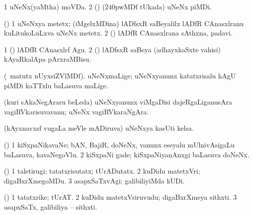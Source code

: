 {{{{{{{\bentry
{} 
\gl{\nA}
\expl{}
\bmng
\bnum
\num{1} uNeNx(yaMtha) moVDa. 
\num{2} (\ca) ($240$pwMDf tUkada) uNeNx piMDi. 
\enum
\emng
\eentry

\bentry
{} 
\gl{\nA}
\expl{}
\bmng
(\birx) 
\bnum
\num{1} uNeNxya metetx; (iMgelxMDina) lADfsxR saBeyalilx lADfR CAnasxlranu kuLitukoLuLxva uNeNx metetx. 
\num{2} (\birx) lADfR CAnasxlrana sAthxna, padavi. 
\enum
\emng

\noindent
\gl{\pagu}
\expl{}
\bmng
\bnum
\num{1}  (\birx) lADfR CAnasxlrf Agu. 
\num{2}  (\birx) lADfsxR saBeya (adhayxkaSxte vahisi) kAyaRkalApa pArxraMBisu. 
\enum
\emng
\eentry

\bentry
{} 
\gl{\nA}
\expl{}
\bmng
(\AseTxrXV\ matutx nUyxsiZVlMDf). uNeNxmaLige; uNeNxyanunx katatxrisalu hAgU piMDi kaTTxlu baLasuva maLige. 
\emng
\eentry

\bentry 
{} 
\gl{\nA}
\expl{}
\bmng
{} 
\emng
\eentry

\bentry
{}
\gl{\nA}
\expl{}
\bmng
{} 
\emng
\eentry

\bentry
{} 
\gl{\nA}
\expl{}
\bmng
(kuri sAkaNegAraru beLeda) uNeNxyanunx viMgaDisi dajeRgaLiganusAra vagiRVkarisuvavanu; uNeNx vagiRVkaraNgAra. 
\emng
\eentry

\bentry
{} 
\gl{\nA}
\expl{}
\bmng
(kAyxnavxsf \mo vugaLa meVle mADiruva) uNeNxya kasUti kelsa. 
\emng
\eentry

\bentry
{} 
\gl{\nA}
\expl{}
\bmng
(\AseTxrXV) 
\bnum
\num{1} kiSxpaNikavaNe; bAN, BajiR, doNeNx, \mo vanunx eseyalu mUlnivAsigaLu baLasuva, kavaNegoVlu. 
\num{2} kiSxpaNi gade; kiSxpaNiyanAnxgi baLasuva doNeNx. 
\enum
\emng
\eentry

\bentry
{} 
\gl{\kirxvi}
\expl{}
\bmng
(\AmA) 
\bnum
\num{1} taletirugi; tatatxrisutatx; tUrADutatx. 
\num{2} kuDidu matetxVri; digaBxrXmegoMDu. 
\num{3} asapxSaTxvAgi; galibiliyiMda kUDi. 
\enum
\emng
\eentry

\bentry
{} 
\gl{\nA}
\expl{}
\bmng
(\AmA) 
\bnum
\num{1} tatatxrike; tUrAT. 
\num{2} kuDidu matetxVriruvudu; digaBxrXmeya sithxti. 
\num{3} asapxSaTx, galibiliya -- sithxti. 
\enum
\emng
\eentry

}}}}}}}
